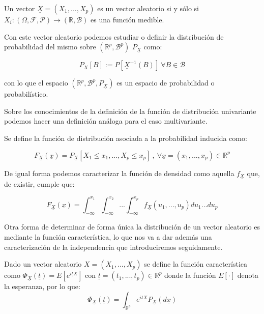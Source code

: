 \begin{proposicion}
	Un vector $\underline{X} = (X_1, ..., X_p)$ es un vector aleatorio si y sólo si $X_i : (\Omega , \mathcal{F}, \mathcal{P}) \rightarrow (\mathbb{R}, \mathcal{B})$ es una función medible.
\end{proposicion}

Con este vector aleatorio podemos estudiar o definir la distribución de probabilidad del mismo sobre $( \mathbb{R}^p , \mathcal{B}^p )$ $P_{\underline{X}}$ como:

$$P_{\underline{X}} [B]:= P[\underline{X}^{-1}(B)] \ \forall B\in \mathcal{B}$$

con lo que el espacio $(\mathbb{R}^p , \mathcal{B}^p , P_{\underline{X}})$ es un espacio de probabilidad o probabilístico.

Sobre los conocimientos de la definición de la función de distribución univariante podemos hacer una definición análoga para el caso multivariante.

\begin{definicion}
	Se define la función de distribución asociada a la probabilidad inducida como:
	
	$$F_{\underline{X}} (\underline{x}) = P_{\underline{X}} [X_1 \leq x_1 , ... , X_p \leq x_p] \ , \ \forall \underline{x} = (x_1 , ... , x_p) \in \mathbb{R}^p$$
\end{definicion}

De igual forma podemos caracterizar la función de densidad como aquella $f_{\underline{X}}$ que, de existir, cumple que:

$$F_{\underline{X}} (\underline{x}) = \int_{- \infty}^{x_1} \int_{-\infty}^{x_2} ... \int_{-\infty}^{x_p} f_{\underline{X}}(u_1 , ... , u_p) du_1 ... du_p$$

Otra forma de determinar de forma única la distribución de un vector aleatorio es mediante la función característica, lo que nos va a dar además una caracterización de la independencia que introduciremos seguidamente.

\begin{definicion}
	Dado un vector aleatorio $X = (X_1 , ... , X_p)$ se define la función característica como $\Phi_{\underline{X}} (\underline{t}) = E[e^{i\underline{t}X}]$ con $\underline{t} = (t_1 , ... , t_p)\in \mathbb{R}^p$ donde la función $E[\cdot]$ denota la esperanza, por lo que:
	$$\Phi_{\underline{X}} (\underline{t}) = \int_{\mathbb{R}^p} e^{i\underline{t} \underline{X}} P_{\underline{X}}(d\underline{x})$$
\end{definicion}

